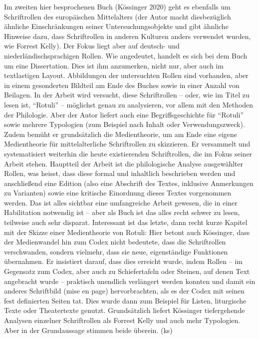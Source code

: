 \documentclass[a4paper,
fontsize=11pt,
oneside,
numbers=noperiodatend,
parskip=half-,
bibliography=totoc,
final
]{scrartcl}
\begin{document}
Im zweiten hier besprochenen Buch (Kössinger 2020) geht es ebenfalls um
Schriftrollen des europäischen Mittelalters (der Autor macht
diesbezüglich ähnliche Einschränkungen seiner Untersuchungsobjekte und
gibt ähnliche Hinweise dazu, dass Schriftrollen in anderen Kulturen
anders verwendet wurden, wie Forrest Kelly). Der Fokus liegt aber auf
deutsch- und niederländischsprachigen Rollen. Wie angedeutet, handelt es
sich bei dem Buch um eine Dissertation. Dies ist ihm anzumerken, nicht
nur, aber auch im textlastigen Layout. Abbildungen der untersuchten
Rollen sind vorhanden, aber in einem gesonderten Bildteil am Ende des
Buches sowie in einer Anzahl von Beilagen. In der Arbeit wird versucht,
diese Schriftrollen -- oder, wie im Titel zu lesen ist, \enquote{Rotuli}
-- möglichst genau zu analysieren, vor allem mit den Methoden der
Philologie. Aber der Autor liefert auch eine Begriffsgeschichte für
\enquote{Rotuli} sowie mehrere Typologien (zum Beispiel nach Inhalt oder
Verwendungszweck). Zudem bemüht er grundsätzlich die Medientheorie, um
am Ende eine eigene Medientheorie für mittelalterliche Schriftrollen zu
skizzieren. Er versammelt und systematisiert weiterhin die heute
existierenden Schriftrollen, die im Fokus seiner Arbeit stehen.
Hauptteil der Arbeit ist die philologische Analyse ausgewählter Rollen,
was heisst, dass diese formal und inhaltlich beschrieben werden und
anschließend eine Edition (also eine Abschrift des Textes, inklusive
Anmerkungen zu Varianten) sowie eine kritische Einordnung dieses Textes
vorgenommen werden. Das ist alles sichtbar eine umfangreiche Arbeit
gewesen, die in einer Habilitation notwendig ist -- aber als Buch ist
das alles recht schwer zu lesen, teilweise auch sehr disparat.
Interessant ist das letzte, dann recht kurze Kapitel mit der Skizze
einer Medientheorie von Rotuli: Hier betont auch Kössinger, dass der
Medienwandel hin zum Codex nicht bedeutete, dass die Schriftrollen
verschwanden, sondern vielmehr, dass sie neue, eigenständige Funktionen
übernahmen. Er insistiert darauf, dass dies erreicht wurde, indem Rollen
-- im Gegensatz zum Codex, aber auch zu Schiefertafeln oder Steinen, auf
denen Text angebracht wurde -- praktisch unendlich verlängert werden
konnten und damit ein anderes Schriftbild (mise en page) hervorbrachten,
als es der Codex mit seinen fest definierten Seiten tat. Dies wurde dann
zum Beispiel für Listen, liturgische Texte oder Theatertexte genutzt.
Grundsätzlich liefert Kössinger tiefergehende Analysen einzelner
Schriftrollen als Forrest Kelly und auch mehr Typologien. Aber in der
Grundaussage stimmen beide überein. (ks)
\end{document}
